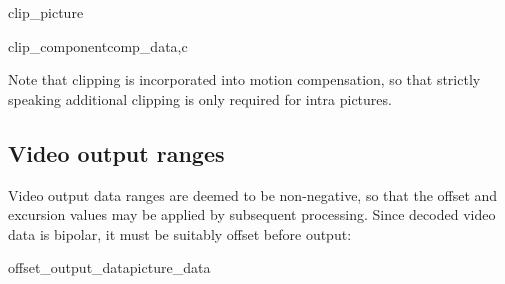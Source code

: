 \begin{pseudo}{clip\_picture}{}
\bsEND
\end{pseudo}


\begin{pseudo}{clip\_component}{comp\_data,c}
\bsELSE
\bsEND
{}
     \bsEND
\bsEND
\end{pseudo}

\begin{informative}
Note that clipping is incorporated into motion compensation, so that strictly speaking additional
clipping is only required for intra pictures.
\end{informative}

\subsection{Video output ranges}
\label{videooutput}

Video output data ranges are deemed to be non-negative, so that the offset and excursion
 values may be applied by subsequent processing. Since decoded video data is bipolar, it must be suitably offset before output:

\begin{pseudo}{offset\_output\_data}{picture\_data}
    \bsELSE
    \bsEND
        \bsEND
    \bsEND
\bsEND
\end{pseudo}
